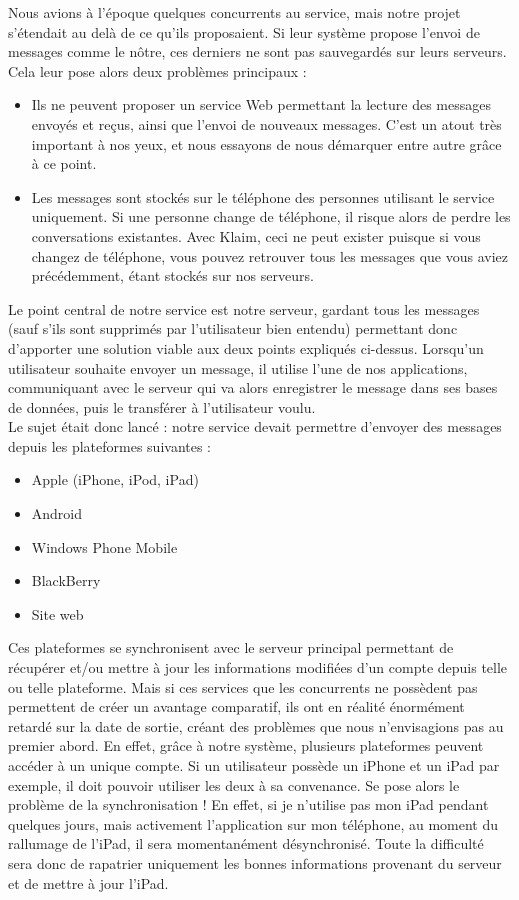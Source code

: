 \documentclass{article}
\begin{document}
	Nous avions à l’époque quelques concurrents au service, mais notre projet s’étendait au delà de ce qu’ils proposaient. Si leur système propose l’envoi de messages comme le nôtre, ces derniers ne sont pas sauvegardés sur leurs serveurs. Cela leur pose alors deux problèmes principaux :
	\begin{itemize}
		\item Ils ne peuvent proposer un service Web permettant la lecture des messages envoyés et reçus, ainsi que l’envoi de nouveaux messages. C'est un atout très important à nos yeux, et nous essayons de nous démarquer entre autre grâce à ce point.
		\item Les messages sont stockés sur le téléphone des personnes utilisant le service uniquement. Si une personne change de téléphone, il risque alors de perdre les conversations existantes. Avec Klaim, ceci ne peut exister puisque si vous changez de téléphone, vous pouvez retrouver tous les messages que vous aviez précédemment, étant stockés sur nos serveurs.\\
	\end{itemize}

Le point central de notre service est notre serveur, gardant tous les messages (sauf s’ils sont supprimés par l’utilisateur bien entendu) permettant donc d’apporter une solution viable aux deux points expliqués ci-dessus. Lorsqu'un utilisateur souhaite envoyer un message, il utilise l'une de nos applications, communiquant avec le serveur qui va alors enregistrer le message dans ses bases de données, puis le transférer à l'utilisateur voulu. \\
	
Le sujet était donc lancé : notre service devait permettre d’envoyer des messages depuis les plateformes suivantes :
	\begin{itemize}
		\item Apple (iPhone, iPod, iPad)
		\item Android
		\item Windows Phone Mobile
		\item BlackBerry
		\item Site web\\
	\end{itemize}

Ces plateformes se synchronisent avec le serveur principal permettant de récupérer et/ou mettre à jour les informations modifiées d’un compte depuis telle ou telle plateforme. Mais si ces services que les concurrents ne possèdent pas permettent de créer un avantage comparatif, ils ont en réalité énormément retardé sur la date de sortie, créant des problèmes que nous n’envisagions pas au premier abord. En effet, grâce à notre système, plusieurs plateformes peuvent accéder à un unique compte. Si un utilisateur possède un iPhone et un iPad par exemple, il doit pouvoir utiliser les deux à sa convenance.  Se pose alors le problème de la synchronisation ! En effet, si je n’utilise pas mon iPad pendant quelques jours, mais activement l’application sur mon téléphone,  au moment du rallumage de l’iPad, il sera momentanément désynchronisé. Toute la difficulté sera donc de rapatrier uniquement les bonnes informations provenant du serveur et de mettre à jour l’iPad.\\
\end{document}
